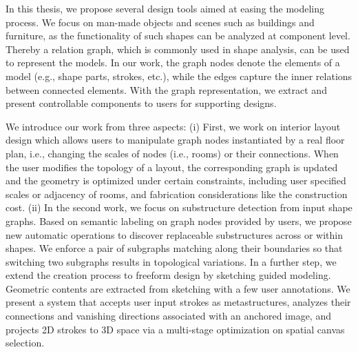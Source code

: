 In this thesis, we propose several design tools aimed at easing the modeling process. We focus on man-made objects and scenes such as buildings and furniture, as the functionality of such shapes can be analyzed at component level. Thereby a relation graph, which is commonly used in shape analysis, can be used to represent the models. In our work, the graph nodes denote the elements of a model (e.g., shape parts, strokes, etc.), while the edges capture the inner relations between connected elements. With the graph representation, we extract and present controllable components to users for supporting designs.


We introduce our work from three aspects: (i) First, we work on interior layout design which allows users to manipulate graph nodes instantiated by a real floor plan, i.e., changing the scales of nodes (i.e., rooms) or their connections. When the user modifies the topology of a layout, the corresponding graph is updated and the geometry is optimized under certain constraints, including user specified scales or adjacency of rooms, and fabrication considerations like the construction cost. (ii) In the second work, we focus on substructure detection from input shape graphs. Based on semantic labeling on graph nodes provided by users, we propose new automatic operations to discover replaceable substructures across or within shapes. We enforce a pair of subgraphs matching along their boundaries so that switching two subgraphs results in topological variations. In a further step, we extend the creation process to freeform design by sketching guided modeling. Geometric contents are extracted from sketching with a few user annotations. We present a system that accepts user input strokes as metastructures, analyzes their connections and vanishing directions associated with an anchored image, and projects 2D strokes to 3D space via a multi-stage optimization on spatial canvas selection.










